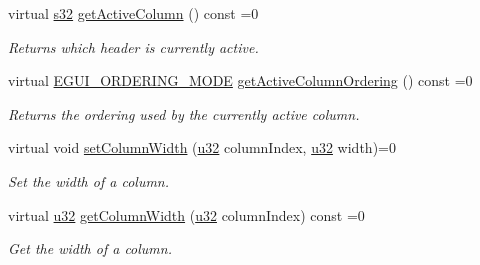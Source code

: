 \begin{DoxyCompactItemize}
\mbox{\label{classirr_1_1gui_1_1IGUITable_ac320d3049aef1cc12f5cc96b63c3f278}} 
virtual \hyperlink{namespaceirr_ac66849b7a6ed16e30ebede579f9b47c6}{s32} \hyperlink{classirr_1_1gui_1_1IGUITable_ac320d3049aef1cc12f5cc96b63c3f278}{get\+Active\+Column} () const =0
\begin{DoxyCompactList}\small\item\em Returns which header is currently active. \end{DoxyCompactList}\item 
\mbox{\label{classirr_1_1gui_1_1IGUITable_a0fbfc0ac0f9de7f11e847042e420c5a6}} 
virtual \hyperlink{namespaceirr_1_1gui_a577bf3aa30c2e3bde9aa3eaa2e4f16d3}{E\+G\+U\+I\+\_\+\+O\+R\+D\+E\+R\+I\+N\+G\+\_\+\+M\+O\+DE} \hyperlink{classirr_1_1gui_1_1IGUITable_a0fbfc0ac0f9de7f11e847042e420c5a6}{get\+Active\+Column\+Ordering} () const =0
\begin{DoxyCompactList}\small\item\em Returns the ordering used by the currently active column. \end{DoxyCompactList}\item 
\mbox{\label{classirr_1_1gui_1_1IGUITable_aa7e268c102808c74f781f3ce47070503}} 
virtual void \hyperlink{classirr_1_1gui_1_1IGUITable_aa7e268c102808c74f781f3ce47070503}{set\+Column\+Width} (\hyperlink{namespaceirr_a0416a53257075833e7002efd0a18e804}{u32} column\+Index, \hyperlink{namespaceirr_a0416a53257075833e7002efd0a18e804}{u32} width)=0
\begin{DoxyCompactList}\small\item\em Set the width of a column. \end{DoxyCompactList}\item 
\mbox{\label{classirr_1_1gui_1_1IGUITable_ab41cd5d05657cfb5e45762f290629645}} 
virtual \hyperlink{namespaceirr_a0416a53257075833e7002efd0a18e804}{u32} \hyperlink{classirr_1_1gui_1_1IGUITable_ab41cd5d05657cfb5e45762f290629645}{get\+Column\+Width} (\hyperlink{namespaceirr_a0416a53257075833e7002efd0a18e804}{u32} column\+Index) const =0
\begin{DoxyCompactList}\small\item\em Get the width of a column. \end{DoxyCompactList}\item 

\end{DoxyCompactItemize}
